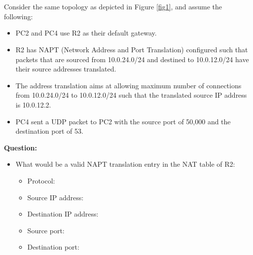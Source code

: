 \documentclass[pdftex,12pt,a4paper]{article}
\begin{document}
        \pagebreak

        \section{}
            Consider the same topology as depicted in Figure \ref{fig1}, and
            assume the following:
            \begin{itemize}
                \item PC2 and PC4 use R2 as their default gateway.
                \item R2 has NAPT (Network Address and Port Translation)
                    configured such that packets that are sourced from
                    10.0.24.0/24 and destined to 10.0.12.0/24 have their source
                    addresses translated.
                \item The address translation aims at allowing maximum number of
                    connections from 10.0.24.0/24 to 10.0.12.0/24 such that the
                    translated source IP address is 10.0.12.2.
                \item PC4 sent a UDP packet to PC2 with the source port of
                    50,000 and the destination port of 53.
            \end{itemize}

            \textbf{Question:}
            \begin{itemize}
                \item What would be a valid NAPT translation entry in the NAT
                    table of R2:
                    \begin{itemize}
                        \item Protocol:
                        \item Source IP address:
                        \item Destination IP address:
                        \item Source port:
                        \item Destination port:
                    \end{itemize}
            \end{itemize}
\end{document}
